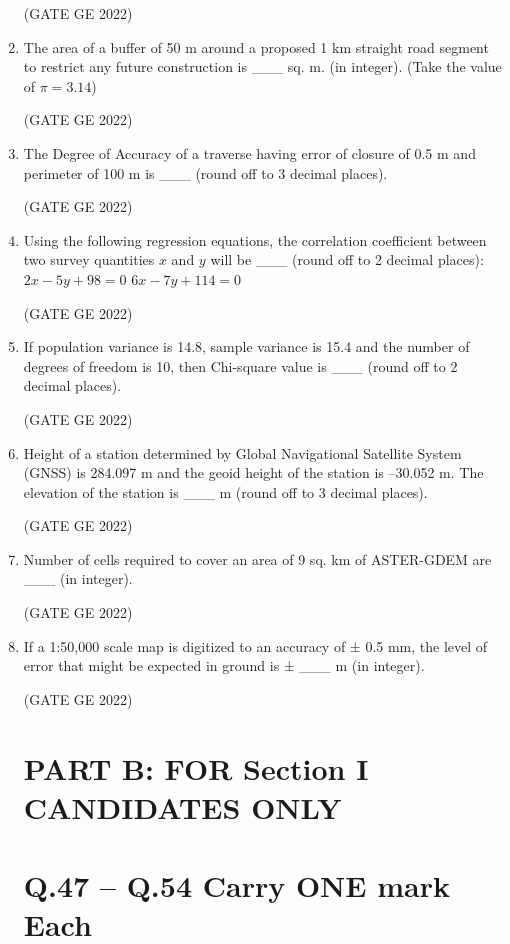 \documentclass[a4paper, 11pt]{article}
\begin{document}
\begin{enumerate}
\hfill (GATE GE 2022)

\item The area of a buffer of 50 m around a proposed 1 km straight road segment to restrict any future construction is \_\_\_ sq. m. (in integer). (Take the value of $\pi = 3.14$)

\hfill (GATE GE 2022)

\item The Degree of Accuracy of a traverse having error of closure of 0.5 m and perimeter of 100 m is \_\_\_ (round off to 3 decimal places).

\hfill (GATE GE 2022)

\item Using the following regression equations, the correlation coefficient between two survey quantities $x$ and $y$ will be \_\_\_ (round off to 2 decimal places):  
$2x - 5y + 98 = 0$  
$6x - 7y + 114 = 0$

\hfill (GATE GE 2022)

\item If population variance is 14.8, sample variance is 15.4 and the number of degrees of freedom is 10, then Chi-square value is \_\_\_ (round off to 2 decimal places).

\hfill (GATE GE 2022)

\item Height of a station determined by Global Navigational Satellite System (GNSS) is 284.097 m and the geoid height of the station is –30.052 m. The elevation of the station is \_\_\_ m (round off to 3 decimal places).

\hfill (GATE GE 2022)

\item Number of cells required to cover an area of 9 sq. km of ASTER-GDEM are \_\_\_ (in integer).

\hfill (GATE GE 2022)

\item If a 1:50,000 scale map is digitized to an accuracy of ± 0.5 mm, the level of error that might be expected in ground is ± \_\_\_ m (in integer).

\hfill (GATE GE 2022)

\section{\textbf{PART B: FOR Section I CANDIDATES ONLY}}
\section{\textbf{Q.47 – Q.54 Carry ONE mark Each}}


\end{enumerate}
\end{document}
